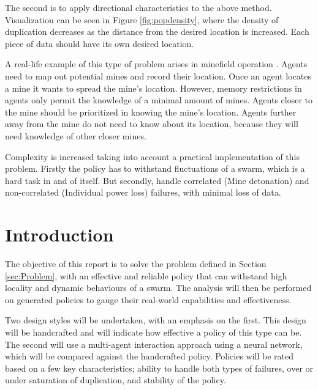 \documentclass{UoYCSproject}
\begin{document}
The second is to apply directional characteristics to the above method.
Visualization can be seen in Figure \ref{fig:popdensity}, where the density of duplication decreases as the distance from the desired location is increased.
Each piece of data should have its own desired location.

A real-life example of this type of problem arises in minefield operation \cite{Cognitive maps mine detection}.
Agents need to map out potential mines and record their location.
Once an agent locates a mine it wants to spread the mine’s location.
However, memory restrictions in agents only permit the knowledge of a minimal amount of mines.
Agents closer to the mine should be prioritized in knowing the mine’s location.
Agents further away from the mine do not need to know about its location, because they will need knowledge of other closer mines.

Complexity is increased taking into account a practical implementation of this problem.
Firstly the policy has to withstand fluctuations of a swarm, which is a hard task in and of itself.
But secondly, handle correlated (Mine detonation) and non-correlated (Individual power loss) failures, with minimal loss of data.




\section{Introduction}
\label{sec:Introduction}

The objective of this report is to solve the problem defined in Section \ref{sec:Problem}, with an effective and reliable policy that can withstand high locality and dynamic behaviours of a swarm.
The analysis will then be performed on generated policies to gauge their real-world capabilities and effectiveness.

Two design styles will be undertaken, with an emphasis on the first.
This design will be handcrafted and will indicate how effective a policy of this type can be.
The second will use a multi-agent interaction approach using a neural network, which will be compared against the handcrafted policy.
Policies will be rated based on a few key characteristics; ability to handle both types of failures, over or under saturation of duplication, and stability of the policy.
\end{document}
